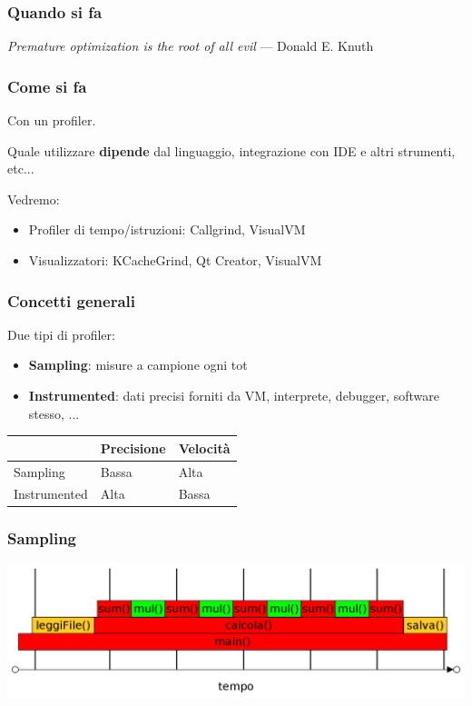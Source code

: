 \documentclass[aspectratio=169]{beamer}
\begin{document}
\begin{frame}
	\frametitle{Quando si fa}
	\textit{Premature optimization is the root of all evil} — Donald E. Knuth
\end{frame}

\begin{frame}
	\frametitle{Come si fa}
	Con un profiler.
	
	Quale utilizzare \textbf{dipende} dal linguaggio, integrazione con IDE e altri strumenti, etc...
	
	Vedremo:
	
	\begin{itemize}
		\item Profiler di tempo/istruzioni: Callgrind, VisualVM
		\item Visualizzatori: KCacheGrind, Qt Creator, VisualVM
	\end{itemize}
\end{frame}

\begin{frame}
	\frametitle{Concetti generali}
	Due tipi di profiler:
	\begin{itemize}
		\item \textbf{Sampling}: misure a campione ogni tot
		\item \textbf{Instrumented}: dati precisi forniti da VM, interprete, debugger, software stesso, ...
	\end{itemize}

	\begin{table}[htbp]
		\def\arraystretch{1.8}%
		\begin{tabular}{l l l}
			             & Precisione & Velocità \\ \hline
			Sampling     & Bassa      & Alta     \\ \hline
			Instrumented & Alta       & Bassa    \\ \hline
		\end{tabular}
	\end{table}
\end{frame}

\begin{frame}
	\frametitle{Sampling}
	\centering
	\includegraphics[width=\linewidth]{sampling}
\end{frame}
\end{document}
